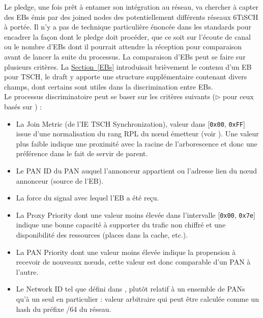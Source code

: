 \documentclass[]{report}
\newcommand{\wordlink}[2]{\hyperref[#2]{#1~\ref{#2}}}
\begin{document}
Le pledge, une fois prêt à entamer son intégration au réseau, va chercher à capter des EBs émis par des joined nodes des potentiellement différents réseaux 6TiSCH à portée. Il n'y a pas de technique particulière énoncée dans les standards pour encadrer la façon dont le pledge doit procéder, que ce soit sur l'écoute de canal ou le nombre d'EBs dont il pourrait attendre la réception pour comparaison avant de lancer la suite du processus. La comparaison d'EBs peut se faire sur plusieurs critères. La \wordlink{Section}{EBs} introduisait brièvement le contenu d'un EB pour TSCH, le draft \cite{ietf-6tisch-enrollment-enhanced-beacon-14} y apporte une structure supplémentaire contenant divers champs, dont certains sont utiles dans la discrimination entre EBs.\\

Le processus discriminatoire peut se baser sur les critères suivants ($\triangleright$ pour ceux basés sur \cite{ietf-6tisch-enrollment-enhanced-beacon-14})  :
\begin{itemize}[label=$\bullet$]
\item La Join Metric (de l'IE TSCH Synchronization), valeur dans [\texttt{0x00}, \texttt{0xFF}] issue d'une normalisation du rang RPL du nœud émetteur (voir \cite{rfc8180}). Une valeur plus faible indique une proximité avec la racine de l'arborescence et donc une préférence dans le fait de servir de parent.
\vspace{0.1cm}
\item Le PAN ID du PAN auquel l'annonceur appartient ou l'adresse lien du nœud annonceur (source de l'EB).
\item La force du signal avec lequel l'EB a été reçu.
\end{itemize} 
\begin{itemize}[label=$\triangleright$]
\item La Proxy Priority dont une valeur moins élevée dans l'intervalle [\texttt{0x00}, \texttt{0x7e}] indique une bonne capacité à supporter du trafic non chiffré et une disponibilité des ressources (places dans la cache, etc.).
\vspace{0.1cm}
\item La PAN Priority dont une valeur moins élevée indique la propension à recevoir de nouveaux nœuds, cette valeur est donc comparable d'un PAN à l'autre.
\vspace{0.1cm}
\item Le Network ID tel que défini dans \cite{ietf-6tisch-enrollment-enhanced-beacon-14}, plutôt relatif à un ensemble de PANs qu'à un seul en particulier : valeur arbitraire qui peut être calculée comme un hash du préfixe /64 du réseau.
\end{itemize}
\vspace{0.4cm}
\end{document}
